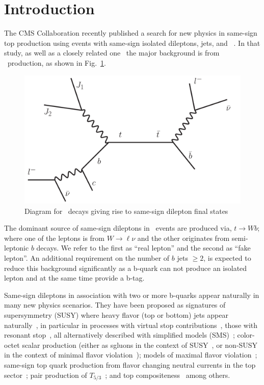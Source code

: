 \section{Introduction}
\label{sec:intro}
The CMS Collaboration recently published a search for new physics
in same-sign top production using events with same-sign isolated dileptons, jets, and \met~\cite{sstop}. 
In that study, as well as a closely related one~\cite{sspaper2010,ssnote2011,sspaper2011} the major
background is from \ttbar\ production, as shown in Fig.~\ref{fig:ttbar}.

\begin{figure}[htb]
\begin{center}
\includegraphics[width=0.6\linewidth, height=0.35\linewidth]{figs/ttbar.pdf}
\caption{ Diagram for \ttbar\ decays giving rise to same-sign dilepton final states \label{fig:ttbar}}
\end{center}
\end{figure}

The dominant source of same-sign dileptons in \ttbar\ events are produced via, $t \rightarrow W b$; where 
one of the leptons is from $W \rightarrow \ell \nu $ and the other originates from semi-leptonic $b$ decays. 
We refer to the first as ``real lepton'' and the second as ``fake lepton''.
An additional requirement on the number of $b$ jets $\geq 2$, is expected to reduce this background significantly
as a b-quark can not produce an isolated lepton and at the same time provide a b-tag.

Same-sign dileptons in association with two or more b-quarks appear naturally in many new physics scenarios.
They have been proposed as signatures of supersymmetry 
(SUSY) where heavy flavor (top or bottom) jets appear naturally~\cite{naturalness1,naturalness2,naturalness3,naturalness4},
in particular in processes with virtual stop contributions~\cite{stopVirtual,stopVirtualPRD},
those with resonant stop~\cite{stopReal},
all alternatively described with simplified models (SMS)~\cite{wacker}; 
color-octet scalar production (either as sgluons in the context of SUSY~\cite{sgluons},
or non-SUSY in the context of minimal flavor violation~\cite{colorOctetScalars}); 
models of maximal flavor violation~\cite{mxflv1,mxflv2,mxflv3}; 
same-sign top quark production from flavor changing neutral currents in the top sector~\cite{fcnczprime};
pair production of $T_{5/3}$~\cite{t53};
and top compositeness~\cite{topcomp1,topcomp2,topcomp3}
among others.

